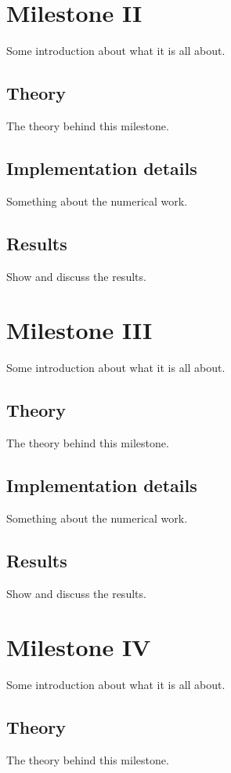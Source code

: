 \documentclass{aa}
\begin{document}
\section{Milestone II}
Some introduction about what it is all about.

\subsection{Theory}
The theory behind this milestone.

\subsection{Implementation details}
Something about the numerical work.

\subsection{Results}
Show and discuss the results.

\section{Milestone III}
Some introduction about what it is all about.

\subsection{Theory}
The theory behind this milestone.

\subsection{Implementation details}
Something about the numerical work.

\subsection{Results}
Show and discuss the results.

\section{Milestone IV}
Some introduction about what it is all about.

\subsection{Theory}
The theory behind this milestone.
\end{document}
